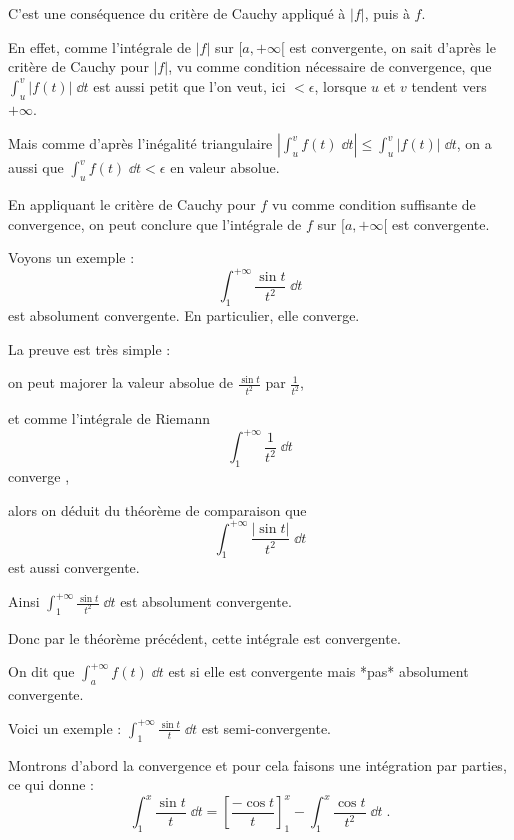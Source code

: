 \change

C'est une conséquence du critère de Cauchy appliqué à $|f|$, 
puis à $f$.

\change
En effet, comme l'intégrale de $|f|$ sur $[a,+\infty[$ est 
convergente, on sait d'après le critère de Cauchy pour $|f|$, 
vu comme condition nécessaire de convergence, que 
$\int_u^v \big|f(t)\big| \;\dd t$ est aussi petit que l'on veut, ici 
$<\epsilon$, lorsque $u$ et $v$ tendent vers $+\infty$.

\change 

Mais comme d'après l'inégalité triangulaire 
$\left|\int_u^v f(t) \;\dd t\right| 
\le \int_u^v \big|f(t)\big| \;\dd t$, 
on a aussi que $\int_u^v f(t) \;\dd t < \epsilon$ en valeur absolue.

\change
En appliquant le critère de Cauchy pour $f$ vu 
comme condition suffisante de convergence, 
on peut conclure que l'intégrale de $f$ sur $[a,+\infty[$ 
est convergente.

\diapo

Voyons un exemple : 
$$\int_1^{+\infty} \frac{\sin t}{t^2}\;\dd t$$
 est absolument convergente.
 En particulier, elle converge.


\change

La preuve est très simple : 

\change
on peut majorer la valeur absolue de 
$\frac{\sin t}{t^2}$ par $\frac{1}{t^2}$, 

\change
et comme l'intégrale de Riemann
$$\int_1^{+\infty} \frac{1}{t^2}\;\dd t$$ converge , 

\change
alors on déduit du théorème de comparaison que 
$$\int_1^{+\infty} \frac{|\sin t|}{t^2}\;\dd t$$ est 
aussi convergente. 

Ainsi $\int_1^{+\infty} \frac{\sin t}{t^2}\;\dd t$
est absolument convergente.

Donc par le théorème précédent, cette intégrale est convergente.


\diapo

On dit que $\int_a^{+\infty} f(t)\;\dd t$ est  si 
elle est convergente mais *pas* absolument convergente.

\change
Voici un exemple :
$\displaystyle \int_1^{+\infty} \frac{\sin t }{t}\;\dd t$ est semi-convergente.

\change
Montrons d'abord la convergence et pour cela 
faisons une intégration par parties, ce qui donne :
$$\int_1^x \frac{\sin t}{t}\;\dd t  = \left[\frac{-\cos t}{t}\right]_1^x
-  \int_1^x \frac{\cos t}{t^2}\;\dd t\;.$$

